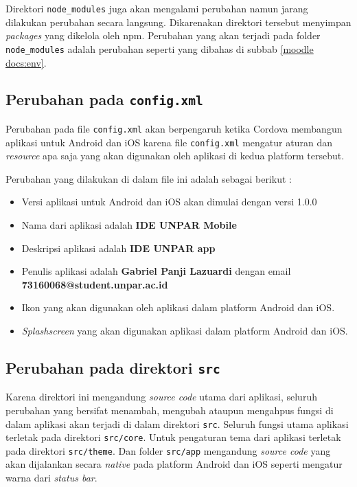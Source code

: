 Direktori \texttt{node\_modules} juga akan mengalami perubahan namun jarang dilakukan perubahan secara langsung. Dikarenakan direktori tersebut menyimpan \textit{packages} yang dikelola oleh npm. Perubahan yang akan terjadi pada folder \texttt{node\_modules} adalah perubahan seperti yang dibahas di subbab \ref{moodle docs:env}.

\subsection{Perubahan pada \texttt{config.xml}}
Perubahan pada file \texttt{config.xml} akan berpengaruh ketika Cordova membangun aplikasi untuk Android dan iOS karena file \texttt{config.xml} mengatur aturan dan \textit{resource} apa saja yang akan digunakan oleh aplikasi di kedua platform tersebut. 

Perubahan yang dilakukan di dalam file ini adalah sebagai berikut : 

\begin{itemize}
\item Versi aplikasi untuk Android dan iOS akan dimulai dengan versi 1.0.0
\item Nama dari aplikasi adalah \textbf{IDE UNPAR Mobile}
\item Deskripsi aplikasi adalah \textbf{IDE UNPAR app}
\item Penulis aplikasi adalah \textbf{Gabriel Panji Lazuardi} dengan email \textbf{73160068@student.unpar.ac.id}
\item Ikon yang akan digunakan oleh aplikasi dalam platform Android dan iOS.
\item \textit{Splashscreen} yang akan digunakan aplikasi dalam platform Android dan iOS.
\end{itemize}  

\subsection{Perubahan pada direktori \texttt{src}}

Karena direktori ini mengandung \textit{source code} utama dari aplikasi, seluruh perubahan yang bersifat menambah, mengubah ataupun mengahpus fungsi di dalam aplikasi akan terjadi di dalam direktori \texttt{src}. Seluruh fungsi utama aplikasi terletak pada direktori \texttt{src/core}. Untuk pengaturan tema dari aplikasi terletak pada direktori \texttt{src/theme}. Dan folder \texttt{src/app} mengandung \textit{source code} yang akan dijalankan secara \textit{native} pada platform Android dan iOS seperti mengatur warna dari \textit{status bar}.	

